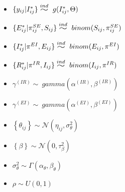 \documentclass[11pt]{article}
\newcommand{\widesim}[2][1.5]{
      \mathrel{\overset{#2}{\scalebox{#1}[1]{$\sim$}}}
  }
\begin{document}
\begin{itemize}
\item 
$\{y_{ij} | I^*_{ij}\} \widesim{ind}\ g(I^*_{ij}, \Theta)$\\

\item
$\{E_{ij}^* | \pi^{SE}_{ij}, S_{ij} \} \widesim{ind}\ binom(S_{ij}, \pi^{SE}_{ij})$ \\

\item
$\{I_{ij}^* | \pi^{EI}, E_{ij} \} \widesim{ind}\ binom(E_{ij}, \pi^{EI})$\\

\item
$\{R_{ij}^* | \pi^{IR}, I_{ij}\} \widesim{ind}\ binom(I_{ij}, \pi^{IR})$\\

\item
$\gamma^{(IR)} \sim\ gamma(\alpha^{(IR)}, \beta^{(IR)})$\\

\item
$\gamma^{(EI)} \sim\ gamma(\alpha^{(EI)}, \beta^{(EI)})$\\

\item
$\left\{ \theta_{ij}\right\} \sim \mathcal{N}(\eta_{ij}, \sigma^2_{\theta})$ \\

\item
$\left\{ \beta \right\} \sim \mathcal{N}(0, \tau^2_\beta) $\\

\item
$\sigma^2_{\theta} \sim \Gamma(\alpha_\theta, \beta_\theta)$\\

\item
$\rho \sim U(0,1)$

\end{itemize}
\end{document}
